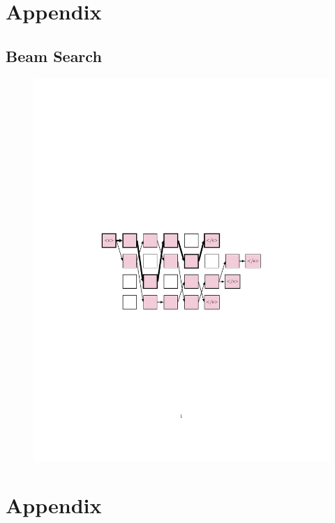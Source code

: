 \documentclass[landscape]{article}
\begin{document}
\section*{Appendix}
\vspace*{10mm}
\subsection*{Beam Search}

\begin{figure}[!htp]
\centering
\includegraphics[trim=4cm 10cm 4cm 10cm, scale=1.7, clip]{figures/beam-search}
\end{figure}

\cp
\thispagestyle{empty}
\section*{Appendix}
\vspace*{10mm}
\end{document}
